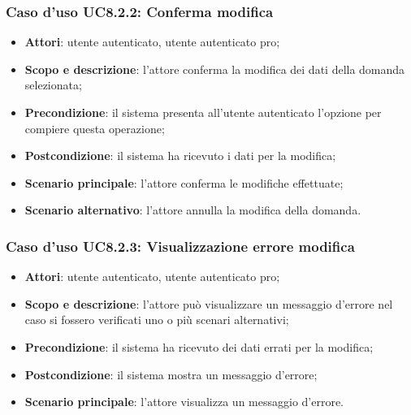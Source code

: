 








	\subsubsection{Caso d'uso UC8.2.2: Conferma modifica}
	\begin{itemize}
		\item
			\textbf{Attori}: utente autenticato, utente autenticato pro;
		\item
			\textbf{Scopo e descrizione}: l'attore conferma la modifica dei dati della domanda selezionata;
		\item		
			\textbf{Precondizione}: il sistema presenta all'utente autenticato l'opzione per compiere questa operazione;
		\item
			\textbf{Postcondizione}: il sistema ha ricevuto i dati per la modifica;
		\item
	 		\textbf{Scenario principale}: l'attore conferma le modifiche effettuate;
	 	\item
	 		\textbf{Scenario alternativo}: l'attore annulla la modifica della domanda.
	\end{itemize}		
	\subsubsection{Caso d'uso UC8.2.3: Visualizzazione errore modifica}
	\begin{itemize}
		\item
			\textbf{Attori}: utente autenticato, utente autenticato pro;
		\item
			\textbf{Scopo e descrizione}: l'attore può visualizzare un messaggio d'errore nel caso si fossero verificati uno o più scenari alternativi;
		\item		
			\textbf{Precondizione}: il sistema ha ricevuto dei dati errati per la modifica;
		\item
			\textbf{Postcondizione}: il sistema mostra un messaggio d'errore;
		\item
	 		\textbf{Scenario principale}: l'attore visualizza un messaggio d'errore.
	\end{itemize}	
	
